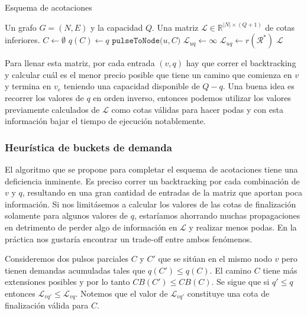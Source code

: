 \begin{algorithm}[H]
  \caption{Esquema de acotaciones}
  \label{al:pulse-bound}
  \begin{algorithmic}[1]
  	\Require Un grafo $G=(N, E)$ y la capacidad $Q$.
  	\Ensure Una matriz $\mathscr{L} \in \mathbb{R}^{|N| \times (Q+1)}$ de cotas inferiores.
                \State $C \gets \emptyset$ 
                \State $q(C) \gets q$
                \State $\texttt{pulseToNode(}u, C \texttt{)}$
                    \State $\mathscr{L}_{uq} \gets \infty$
                \Else
                    \State $\mathscr{L}_{uq} \gets r(\mathscr{R}^{*})$
                \EndIf
            \EndFor
        \EndFor
        \Return $\mathscr{L}$
  \end{algorithmic}
\end{algorithm}

Para llenar esta matriz, por cada entrada $(v, q)$ hay que correr el backtracking y calcular cuál es el menor precio posible que tiene un camino que comienza en $v$ y termina en $v_e$ teniendo una capacidad disponible de $Q - q$. Una buena idea es recorrer los valores de $q$ en orden inverso, entonces podemos utilizar los valores previamente calculados de $\mathscr{L}$ como cotas válidas para hacer podas y con esta información bajar el tiempo de ejecución notablemente. 

\subsubsection{Heurística de buckets de demanda}

El algoritmo que se propone para completar el esquema de acotaciones tiene una deficiencia inminente. Es preciso correr un backtracking por cada combinación de $v$ y $q$, resultando en una gran cantidad de entradas de la matriz que aportan poca información. Si nos limitásemos a calcular los valores de las cotas de finalización solamente para algunos valores de $q$, estaríamos ahorrando muchas propagaciones en detrimento de perder algo de información en $\mathscr{L}$ y realizar menos podas. En la práctica nos gustaría encontrar un trade-off entre ambos fenómenos.

Consideremos dos pulsos parciales $C$ y $C'$ que se sitúan en el mismo nodo $v$ pero tienen demandas acumuladas tales que $q(C') \leq q(C)$. El camino $C$ tiene más extensiones posibles y por lo tanto $CB(C') \leq CB(C)$. Se sigue que si $q' \leq q$ entonces $\mathscr{L}_{vq'} \leq \mathscr{L}_{vq}$. Notemos que el valor de $\mathscr{L}_{vq'}$ constituye una cota de finalización válida para $C$.

